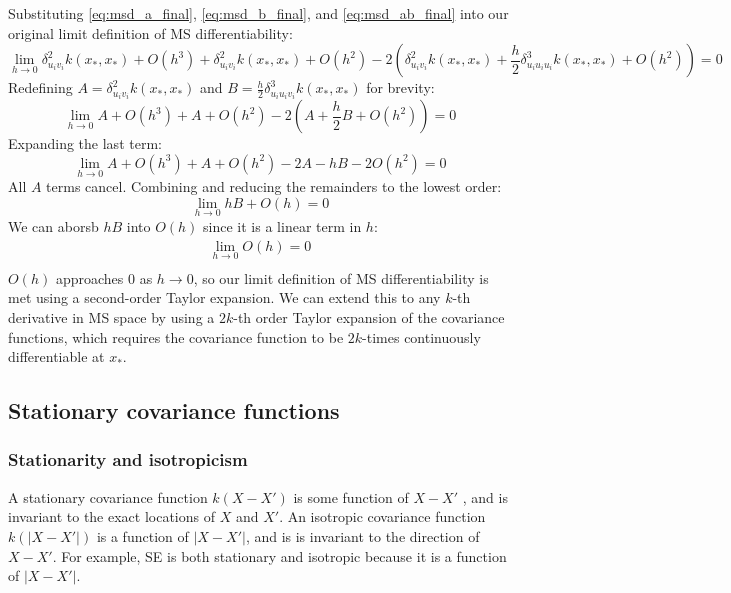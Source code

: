 Substituting \ref{eq:msd_a_final}, \ref{eq:msd_b_final}, and \ref{eq:msd_ab_final} into our original limit definition of MS differentiability:
\begin{equation*}
    \lim_{h \to 0} \delta_{u_i v_i}^2 k(x_*, x_*) + O(h^3) + \delta_{u_i v_i}^2 k(x_*, x_*) + O(h^2) - 2 \left( \delta_{u_i v_i}^2 k(x_*, x_*) + \frac{h}{2} \delta_{u_i u_i u_i}^3 k(x_*, x_*) + O(h^2) \right) = 0 
\end{equation*}
Redefining $A = \delta_{u_i v_i}^2 k(x_*, x_*)$ and $B = \frac{h}{2} \delta_{u_i u_i v_i}^3 k(x_*, x_*)$ for brevity:
\begin{equation*}
    \lim_{h \to 0} A + O(h^3) + A + O(h^2) - 2(A + \frac{h}{2}B + O(h^2)) = 0
\end{equation*}
Expanding the last term:
\begin{equation*}
    \lim_{h \to 0} A + O(h^3) + A + O(h^2) - 2A - hB - 2O(h^2) = 0
\end{equation*}
All $A$ terms cancel. Combining and reducing the remainders to the lowest order:
\begin{equation*}
    \lim_{h \to 0} hB + O(h) = 0
\end{equation*}
We can aborsb $hB$ into $O(h)$ since it is a linear term in $h$:
\begin{equation} \label{eq:ms_differentiability}
    \begin{aligned}
        \lim_{h \to 0} O(h) = 0 \\
    \end{aligned}
\end{equation}
$O(h)$ approaches $0$ as $h \to 0$, so our limit definition of MS differentiability is met using a second-order Taylor expansion. We can extend this to any $k$-th derivative in MS space by using a $2k$-th order Taylor expansion of the covariance functions, which requires the covariance function to be $2k$-times continuously differentiable at $x_*$.

\subsection{Stationary covariance functions}

\subsubsection{Stationarity and isotropicism}
A stationary covariance function \cite{gp-ml} $k(X - X')$ is some function of $X - X'$ , and is invariant to the exact locations of $X$ and $X'$. An isotropic covariance function $k(|X - X'|)$ is a function of $|X - X'|$, and is is invariant to the direction of $X - X'$. For example, SE \cite{eq:se} is both stationary and isotropic because it is a function of $|X - X'|$.

